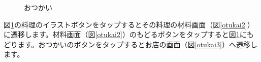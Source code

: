 \documentclass[a4j]{jarticle}
\begin{document}
\begin{figure}[H]
    \begin{center}
    \caption {おつかい}
    \label{otukai1}
    \end{center}
\end{figure}

図\ref{otukai1}の料理のイラストボタンをタップするとその料理の材料画面（図\ref{otukai2}）に遷移します。材料画面（図\ref{otukai2}）のもどるボタンをタップすると図\ref{otukai1}にもどります。おつかいのボタンをタップするとお店の画面（図\ref{otukai3}）へ遷移します。
\end{document}
